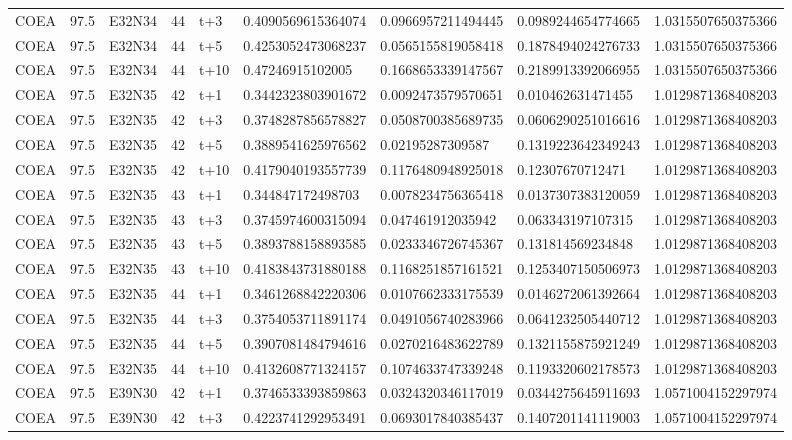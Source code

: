 \begin{landscape}
\begin{longtable}{lllllllll}
COEA & 97.5 & E32N34 & 44 & t+3 & 0.4090569615364074 & 0.0966957211494445 & 0.0989244654774665 & 1.0315507650375366 \\
COEA & 97.5 & E32N34 & 44 & t+5 & 0.4253052473068237 & 0.0565155819058418 & 0.1878494024276733 & 1.0315507650375366 \\
COEA & 97.5 & E32N34 & 44 & t+10 & 0.47246915102005 & 0.1668653339147567 & 0.2189913392066955 & 1.0315507650375366 \\
COEA & 97.5 & E32N35 & 42 & t+1 & 0.3442323803901672 & 0.0092473579570651 & 0.010462631471455 & 1.0129871368408203 \\
COEA & 97.5 & E32N35 & 42 & t+3 & 0.3748287856578827 & 0.0508700385689735 & 0.0606290251016616 & 1.0129871368408203 \\
COEA & 97.5 & E32N35 & 42 & t+5 & 0.3889541625976562 & 0.02195287309587 & 0.1319223642349243 & 1.0129871368408203 \\
COEA & 97.5 & E32N35 & 42 & t+10 & 0.4179040193557739 & 0.1176480948925018 & 0.12307670712471 & 1.0129871368408203 \\
COEA & 97.5 & E32N35 & 43 & t+1 & 0.344847172498703 & 0.0078234756365418 & 0.0137307383120059 & 1.0129871368408203 \\
COEA & 97.5 & E32N35 & 43 & t+3 & 0.3745974600315094 & 0.047461912035942 & 0.063343197107315 & 1.0129871368408203 \\
COEA & 97.5 & E32N35 & 43 & t+5 & 0.3893788158893585 & 0.0233346726745367 & 0.131814569234848 & 1.0129871368408203 \\
COEA & 97.5 & E32N35 & 43 & t+10 & 0.4183843731880188 & 0.1168251857161521 & 0.1253407150506973 & 1.0129871368408203 \\
COEA & 97.5 & E32N35 & 44 & t+1 & 0.3461268842220306 & 0.0107662333175539 & 0.0146272061392664 & 1.0129871368408203 \\
COEA & 97.5 & E32N35 & 44 & t+3 & 0.3754053711891174 & 0.0491056740283966 & 0.0641232505440712 & 1.0129871368408203 \\
COEA & 97.5 & E32N35 & 44 & t+5 & 0.3907081484794616 & 0.0270216483622789 & 0.1321155875921249 & 1.0129871368408203 \\
COEA & 97.5 & E32N35 & 44 & t+10 & 0.4132608771324157 & 0.1074633747339248 & 0.1193320602178573 & 1.0129871368408203 \\
COEA & 97.5 & E39N30 & 42 & t+1 & 0.3746533393859863 & 0.0324320346117019 & 0.0344275645911693 & 1.0571004152297974 \\
COEA & 97.5 & E39N30 & 42 & t+3 & 0.4223741292953491 & 0.0693017840385437 & 0.1407201141119003 & 1.0571004152297974 \\

\end{longtable}
\end{landscape}
